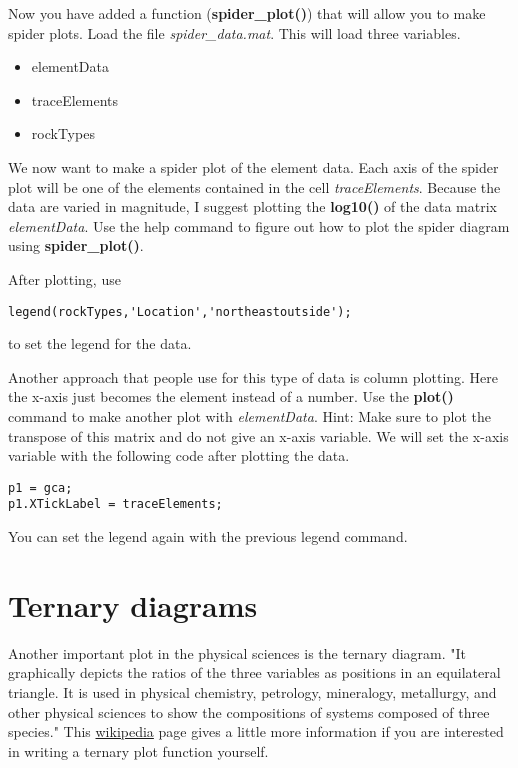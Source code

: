 \documentclass[10pt,fleqn]{article}
\begin{document}
Now you have added a function (\textbf{spider\_plot()}) that will allow you to make spider plots. Load the file \textit{spider\_data.mat}. This will load three variables.

\begin{itemize}
	\item elementData
	\item traceElements
	\item rockTypes
\end{itemize}

We now want to make a spider plot of the element data. Each axis of the spider plot will be one of the elements contained in the cell \textit{traceElements}. Because the data are varied in magnitude, I suggest plotting the \textbf{log10()} of the data matrix \textit{elementData}. Use the help command to figure out how to plot the spider diagram using \textbf{spider\_plot()}.

After plotting, use 
\begin{lstlisting}
legend(rockTypes,'Location','northeastoutside');
\end{lstlisting}
to set the legend for the data.

Another approach that people use for this type of data is column plotting. Here the x-axis just becomes the element instead of a number. Use the \textbf{plot()} command to make another plot with \textit{elementData}. Hint: Make sure to plot the transpose of this matrix and do not give an x-axis variable. We will set the x-axis variable with the following code after plotting the data.
\begin{lstlisting}
p1 = gca;
p1.XTickLabel = traceElements;
\end{lstlisting}

You can set the legend again with the previous legend command.

\section*{Ternary diagrams}

Another important plot in the physical sciences is the ternary diagram. "It graphically depicts the ratios of the three variables as positions in an equilateral triangle. It is used in physical chemistry, petrology, mineralogy, metallurgy, and other physical sciences to show the compositions of systems composed of three species." This \href{https://en.wikipedia.org/wiki/Ternary_plot}{wikipedia} page gives a little more information if you are interested in writing a ternary plot function yourself.
\end{document}
